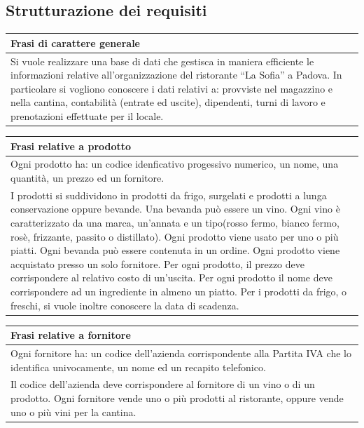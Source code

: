 \subsection{Strutturazione dei requisiti} %
\begin{longtable}{|p{15.5cm}|}
    \hline
    \textbf{Frasi di carattere generale} \\ \hline
    Si vuole realizzare una base di dati che gestisca in maniera efficiente le informazioni relative all’organizzazione del ristorante “La Sofia” a Padova. In particolare si vogliono conoscere i dati relativi a: provviste nel magazzino e nella cantina, contabilità (entrate ed uscite), dipendenti, turni di lavoro e prenotazioni effettuate per il locale. \\ \hline
\end{longtable}

\begin{longtable}{|p{15.5cm}|}
    \hline
    \textbf{Frasi relative a prodotto} \\ \hline
    Ogni prodotto ha: un codice idenficativo progessivo numerico, un nome, una quantità, un prezzo ed un fornitore.\\
    I prodotti si suddividono in prodotti da frigo, surgelati e prodotti a lunga conservazione
oppure bevande.
Una bevanda può essere un vino.
Ogni vino è caratterizzato da una marca, un’annata e un tipo(rosso fermo, bianco
fermo, rosè, frizzante, passito o distillato).
Ogni prodotto viene usato per uno o più piatti.
Ogni bevanda può essere contenuta in un ordine.
Ogni prodotto viene acquistato presso un solo fornitore.
Per ogni prodotto, il prezzo deve corrispondere al relativo costo di un’uscita.
Per ogni prodotto il nome deve corrispondere ad un ingrediente in almeno un piatto.
Per i prodotti da frigo, o freschi, si vuole inoltre conoscere la data di scadenza.\\ \hline
\end{longtable}

\begin{longtable}{|p{15.5cm}|}
    \hline
    \textbf{Frasi relative a fornitore} \\ \hline
    Ogni fornitore ha: un codice dell'azienda corrispondente alla Partita IVA che lo identifica univocamente, un nome ed un recapito telefonico.\\
    Il codice dell’azienda deve corrispondere al fornitore di un vino o di un prodotto.
Ogni fornitore vende uno o più prodotti al ristorante, oppure vende uno o più vini per la
cantina.
    \\ \hline
\end{longtable}

